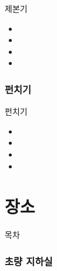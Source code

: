 \documentclass[aspectratio=1610,17pt,xcolor=pdftex,dvipsnames,table,handout]{beamer}
\begin{document}
		\begin{frame} [t,plain]
			\begin{block} { 제본기 }
			\begin{itemize}
				\item 
				\item 
				\item 
				\item 
			\end{itemize}
			\end{block}
		\end{frame}


		\section{ 펀치기 }
		\frame [plain] {\sectionpage}

		\begin{frame} [t,plain]
			\begin{block} { 펀치기  }
			\begin{itemize}
				\item 
				\item 
				\item 
				\item 
			\end{itemize}
			\end{block}
		\end{frame}



		\part{ 장소 }
		\frame{\partpage}


		\begin{frame} [plain]{목차}
		\tableofcontents
		\end{frame}
		

		\section{ 초량 지하실 }
		\frame [plain] {\sectionpage}
\end{document}

